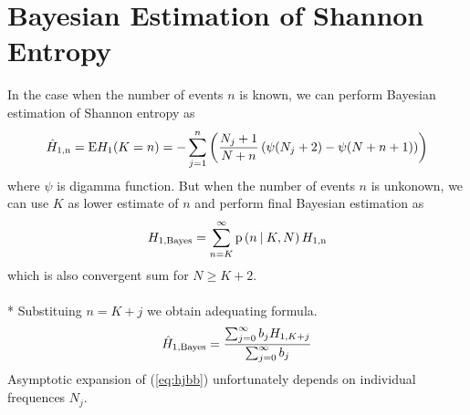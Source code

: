 \section {Bayesian Estimation of Shannon Entropy}
In the case when the number of events $n$ is known, we can perform Bayesian estimation of Shannon entropy as
\begin{equation} 
\label{eq:hjednan}
\hat{H}_{1,\mbox{\scriptsize{n}}} = \text{E}H_{1}(K=n) = -\sum_{j=1}^{n} \left( \frac{N_{j}+1}{N+n} \left( \psi(N_{j}+2) - \psi(N+n+1) \right) \right)
\end{equation}
where $\psi$ is digamma function. But when the number of events $n$ is unkonown, we can use $K$ as lower estimate of $n$ and perform final Bayesian estimation as
\begin{equation} 
\label{eq:hjednab}
H_{1,\mbox{\scriptsize{Bayes}}} = \sum_{n=K}^{\infty}{\text{p}\left(n \: \middle| \:K,N \right)H_{1,\mbox{\scriptsize{n}}}}
\end{equation}
which is also convergent sum for $N \ge K+2$. \\
\\*
Substituing $n=K+j$ we obtain adequating formula.
\begin{equation} 
\label{eq:hjbb}
\hat{H}_{1,\mbox{\scriptsize{Bayes}}} = \frac{\sum_{j=0}^{\infty}b_{j}H_{1,K+j}}{\sum_{j=0}^{\infty}b_{j}}
\end{equation}
Asymptotic expansion of (\ref{eq:hjbb}) unfortunately depends on individual frequences $N_{j}$.